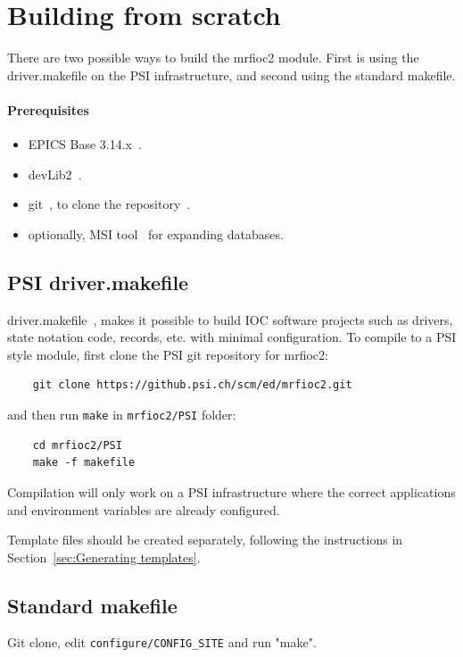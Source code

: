 \documentclass[12pt,a4paper]{article}
\let\stdsection\section
\renewcommand\section{\newpage\stdsection}
\begin{document}
\section{Building from scratch}\label{sec:Building from scratch}
There are two possible ways to build the mrfioc2 module. First is using the driver.makefile on the PSI infrastructure, and second using the standard makefile.

\paragraph{Prerequisites}
\begin{itemize}
\item 
	EPICS Base 3.14.x~\cite{epics}.
\item 
	devLib2~\cite{devlib2}.
\item
	git~\cite{git}, to clone the repository~\cite{git_mrfioc2}.
\item 
	optionally, MSI tool~\cite{msi} for expanding databases.
\end{itemize}

\subsection{PSI driver.makefile}\label{sec:PSI driver.makefile}
driver.makefile~\cite{driver.makefile}, makes it possible to build IOC software projects such as drivers, state notation code, records, etc. with minimal configuration.
To compile to a PSI style module, first clone the PSI git repository for mrfioc2:
\begin{verbatim}
	git clone https://github.psi.ch/scm/ed/mrfioc2.git
\end{verbatim}
and then run \texttt{make} in \texttt{mrfioc2/PSI} folder:
\begin{verbatim}
	cd mrfioc2/PSI
	make -f makefile
\end{verbatim}
Compilation will only work on a PSI infrastructure where the correct applications and environment variables are already configured.

Template files should be created separately, following the instructions in Section~\ref{sec:Generating templates}.

\subsection{Standard makefile}\label{sec:Standard makefile}
Git clone, edit \texttt{configure/CONFIG\_SITE} and run "make".
\end{document}
